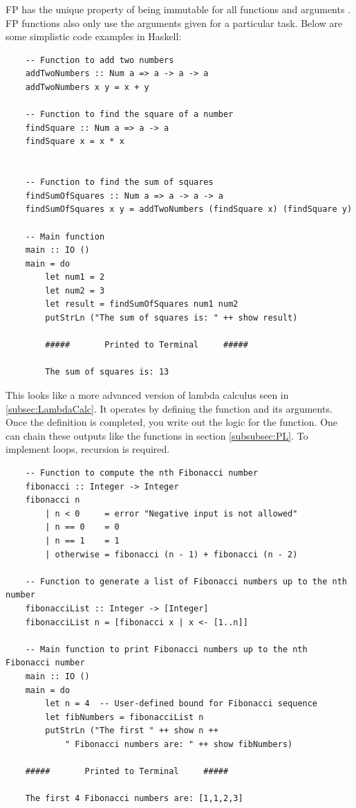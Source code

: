 FP has the unique property of being immutable for all functions and arguments \cite{FP1,FP2,RefTransp1,RefTransp2}.
FP functions also only use the arguments given for a particular task.
Below are some simplistic code examples in Haskell:

\begin{verbatim}
    -- Function to add two numbers
    addTwoNumbers :: Num a => a -> a -> a
    addTwoNumbers x y = x + y
    
    -- Function to find the square of a number
    findSquare :: Num a => a -> a
    findSquare x = x * x
    

    -- Function to find the sum of squares
    findSumOfSquares :: Num a => a -> a -> a
    findSumOfSquares x y = addTwoNumbers (findSquare x) (findSquare y)
    
    -- Main function
    main :: IO ()
    main = do
        let num1 = 2
        let num2 = 3
        let result = findSumOfSquares num1 num2
        putStrLn ("The sum of squares is: " ++ show result) 

        #####       Printed to Terminal     #####

        The sum of squares is: 13
\end{verbatim}

This looks like a more advanced version of lambda calculus seen in \ref{subsec:LambdaCalc}.
It operates by defining the function and its arguments.
Once the definition is completed, you write out the logic for the function.
One can chain these outputs like the functions in section \ref{subsubsec:PL}.
To implement loops, recursion is required.

\begin{verbatim}
    -- Function to compute the nth Fibonacci number
    fibonacci :: Integer -> Integer
    fibonacci n
        | n < 0     = error "Negative input is not allowed"
        | n == 0    = 0
        | n == 1    = 1
        | otherwise = fibonacci (n - 1) + fibonacci (n - 2)

    -- Function to generate a list of Fibonacci numbers up to the nth number
    fibonacciList :: Integer -> [Integer]
    fibonacciList n = [fibonacci x | x <- [1..n]]

    -- Main function to print Fibonacci numbers up to the nth Fibonacci number
    main :: IO ()
    main = do
        let n = 4  -- User-defined bound for Fibonacci sequence
        let fibNumbers = fibonacciList n
        putStrLn ("The first " ++ show n ++  
            " Fibonacci numbers are: " ++ show fibNumbers)

    #####       Printed to Terminal     #####

    The first 4 Fibonacci numbers are: [1,1,2,3]
\end{verbatim}

